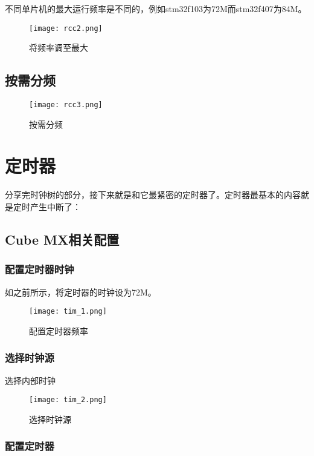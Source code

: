 \documentclass[cn,11pt]{elegantbook}
\begin{document}
不同单片机的最大运行频率是不同的，例如stm32f103为72M而stm32f407为84M。

\begin{figure}[htbp]
	\centering
	\texttt{[image: rcc2.png]}
	\caption{将频率调至最大 \label{fig:scatter}}
\end{figure}


\subsection{按需分频}


\begin{figure}[htbp]
	\centering
	\texttt{[image: rcc3.png]}
	\caption{按需分频 \label{fig:scatter}}
\end{figure}

\section{定时器}
分享完时钟树的部分，接下来就是和它最紧密的定时器了。定时器最基本的内容就是定时产生中断了：
\subsection{Cube MX相关配置}
\subsubsection{配置定时器时钟}


如之前所示，将定时器的时钟设为72M。
\begin{figure}[htbp]
	\centering
	\texttt{[image: tim\_1.png]}
	\caption{配置定时器频率 \label{fig:scatter}}
\end{figure}


\subsubsection{选择时钟源}

选择内部时钟

\begin{figure}[htbp]
	\centering
	\texttt{[image: tim\_2.png]}
	\caption{选择时钟源 \label{fig:scatter}}
\end{figure}

\subsubsection{配置定时器}
\end{document}
